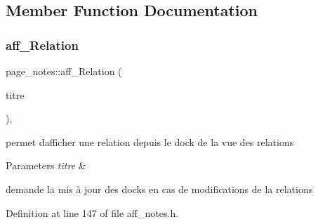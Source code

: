 \subsection{Member Function Documentation}
\mbox{\label{classpage__notes_a5c00719607b3e0f3a78c3b35b6df4df9}} 
\subsubsection{\texorpdfstring{aff\+\_\+\+Relation}{aff\_Relation}}
{\footnotesize\ttfamily page\+\_\+notes\+::aff\+\_\+\+Relation (\begin{DoxyParamCaption}\item[{Q\+String}]{titre }\end{DoxyParamCaption})\hspace{0.3cm}{\ttfamily [inline]}, {\ttfamily [slot]}}



permet d\textquotesingle{}afficher une relation depuis le dock de la vue des relations 


\begin{DoxyParams}{Parameters}
{\em titre} & \\
\hline
\end{DoxyParams}
demande la mis à jour des docks en cas de modifications de la relations 

Definition at line 147 of file aff\+\_\+notes.\+h.

